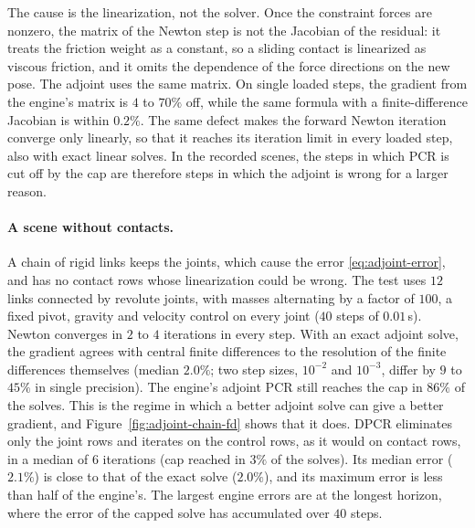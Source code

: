 The cause is the linearization, not the solver. Once the constraint
forces are nonzero, the matrix of the Newton step is not the Jacobian of
the residual: it treats the friction weight as a constant, so a sliding
contact is linearized as viscous friction, and it omits the dependence
of the force directions on the new pose. The adjoint uses the same
matrix. On single loaded steps, the gradient from the engine's matrix is
$4$ to $70\%$ off, while the same formula with a finite-difference
Jacobian is within $0.2\%$. The same defect makes the forward Newton
iteration converge only linearly, so that it reaches its iteration limit
in every loaded step, also with exact linear solves. In the recorded
scenes, the steps in which PCR is cut off by the cap are therefore steps
in which the adjoint is wrong for a larger reason.

\paragraph{A scene without contacts.}
A chain of rigid links keeps the joints, which cause the error
\eqref{eq:adjoint-error}, and has no contact rows whose linearization
could be wrong. The test uses $12$ links connected by revolute joints,
with masses alternating by a factor of $100$, a fixed pivot, gravity and
velocity control on every joint ($40$ steps of $0.01$\,s). Newton
converges in $2$ to $4$ iterations in every step. With an exact adjoint
solve, the gradient agrees with central finite differences to the
resolution of the finite differences themselves (median $2.0\%$; two step
sizes, $10^{-2}$ and $10^{-3}$, differ by $9$ to $45\%$ in single
precision). The engine's adjoint PCR still reaches the cap in $86\%$ of
the solves. This is the regime in which a better adjoint solve can give a
better gradient, and Figure~\ref{fig:adjoint-chain-fd} shows that it
does. DPCR eliminates only the joint rows and iterates on the control
rows, as it would on contact rows, in a median of $6$ iterations (cap
reached in $3\%$ of the solves). Its median
error ($2.1\%$) is close to that of the exact solve ($2.0\%$), and its
maximum error is less than half of the engine's. The largest engine errors are at the longest
horizon, where the error of the capped solve has accumulated over $40$
steps.

